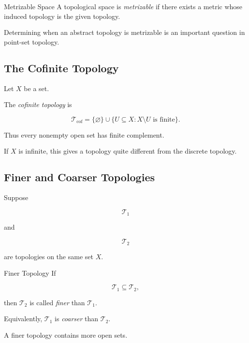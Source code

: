 \begin{definitionbox}{Metrizable Space}
A topological space is \emph{metrizable} if there exists a metric whose
induced topology is the given topology.
\end{definitionbox}

Determining when an abstract topology is metrizable is an important question
in point-set topology.

\subsection{The Cofinite Topology}
\label{subsec:cofinite-topology}

Let \(X\) be a set.

The \emph{cofinite topology} is

\[
\boxed{
\mathcal{T}_{\mathrm{cof}}
=
\{\varnothing\}
\cup
\{
U\subseteq X:X\setminus U\text{ is finite}
\}.
}
\]

Thus every nonempty open set has finite complement.

If \(X\) is infinite, this gives a topology quite different from the
discrete topology.

\subsection{Finer and Coarser Topologies}
\label{subsec:finer-coarser-topologies}

Suppose

\[
\mathcal{T}_1
\]

and

\[
\mathcal{T}_2
\]

are topologies on the same set \(X\).

\begin{definitionbox}{Finer Topology}
If

\[
\boxed{
\mathcal{T}_1\subseteq\mathcal{T}_2,
}
\]

then \(\mathcal{T}_2\) is called \emph{finer} than \(\mathcal{T}_1\).

Equivalently, \(\mathcal{T}_1\) is \emph{coarser} than \(\mathcal{T}_2\).
\end{definitionbox}

A finer topology contains more open sets.

